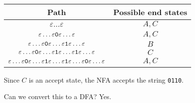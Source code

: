 \documentclass{notes}
\begin{document}
\begin{center}
  \begin{tabular}{cc}
    Path & Possible end states \\ 
    \hline
    $\varepsilon \dots \varepsilon$ & $A, C$ \\ 
    $\varepsilon \dots \varepsilon \verb~0~ \varepsilon \dots \varepsilon$ & $A, C$ \\ 
    $\varepsilon \dots \varepsilon \verb~0~ \varepsilon \dots \varepsilon \verb~1~ \varepsilon \dots \varepsilon$ & $B$ \\ 
    $\varepsilon \dots \varepsilon \verb~0~ \varepsilon \dots \varepsilon \verb~1~ \varepsilon \dots \varepsilon \verb~1~ \varepsilon \dots \varepsilon$ & $C$ \\ 
    $\varepsilon \dots \varepsilon \verb~0~ \varepsilon \dots \varepsilon \verb~1~ \varepsilon \dots \varepsilon \verb~1~ \varepsilon \dots \varepsilon \verb~0~ \varepsilon \dots \varepsilon$ & $A, C$ \\ 
  \end{tabular}
\end{center}

Since $C$ is an accept state, the NFA accepts the string \verb~0110~.

\newpage

Can we convert this to a DFA? Yes.
\end{document}
